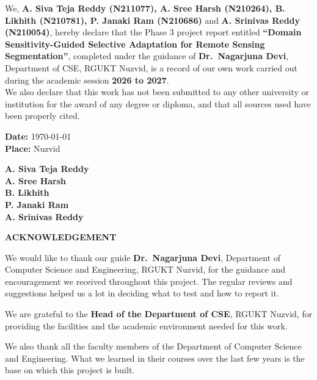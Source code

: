 \documentclass[11pt,a4paper]{report}
\newif\ifblankpage
\newcommand{\blankpage}{%
  \clearpage\blankpagetrue\thispagestyle{empty}\null\clearpage
  \blankpagefalse\addtocounter{page}{-1}}
\begin{document}
We, \textbf{A. Siva Teja Reddy (N211077), A. Sree Harsh (N210264), B. Likhith (N210781), P. Janaki Ram (N210686)} and \textbf{A. Srinivas Reddy (N210054)}, hereby declare that the Phase 3 project report entitled \textbf{``Domain Sensitivity-Guided Selective Adaptation for Remote Sensing Segmentation''}, completed under the guidance of \textbf{Dr.~Nagarjuna Devi}, Department of CSE, RGUKT Nuzvid, is a record of our own work carried out during the academic session \textbf{2026 to 2027}.\\[0.4cm]

We also declare that this work has not been submitted to any other university or institution for the award of any degree or diploma, and that all sources used have been properly cited.

\vspace{0.8cm}
\noindent
\textbf{Date:} \today\\[0.3cm]
\textbf{Place:} Nuzvid

\vspace{0.6cm}
\begin{flushright}
\textbf{A. Siva Teja Reddy}\\
\textbf{A. Sree Harsh}\\
\textbf{B. Likhith}\\
\textbf{P. Janaki Ram}\\
\textbf{A. Srinivas Reddy}
\end{flushright}

\blankpage

\begin{center}
\textbf{\Large ACKNOWLEDGEMENT}
\end{center}

\vspace{0.5cm}
We would like to thank our guide \textbf{Dr.~Nagarjuna Devi}, Department of Computer Science and Engineering, RGUKT Nuzvid, for the guidance and encouragement we received throughout this project. The regular reviews and suggestions helped us a lot in deciding what to test and how to report it.

We are grateful to the \textbf{Head of the Department of CSE}, RGUKT Nuzvid, for providing the facilities and the academic environment needed for this work.

We also thank all the faculty members of the Department of Computer Science and Engineering. What we learned in their courses over the last few years is the base on which this project is built.
\end{document}
